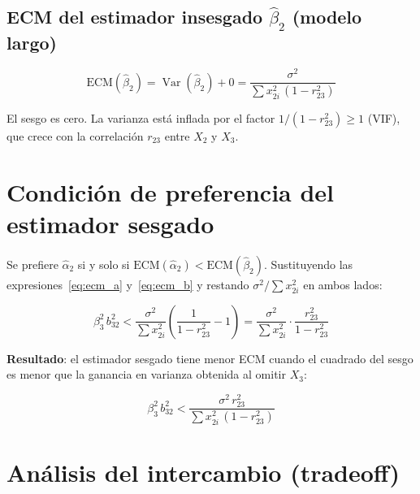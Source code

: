 \documentclass[12pt, letterpaper]{article}
\newcommand{\Var}{\operatorname{Var}}
\begin{document}
\subsection{ECM del estimador insesgado $\hat{\beta}_2$ (modelo largo)}

\begin{equation}
  \mathrm{ECM}(\hat{\beta}_2)
  = \Var(\hat{\beta}_2) + 0
  = \frac{\sigma^2}{\sum x_{2i}^2\,(1 - r_{23}^2)}
\end{equation}

El sesgo es cero. La varianza está inflada por el factor $1/(1-r_{23}^2)\geq 1$
(VIF), que crece con la correlación $r_{23}$ entre $X_2$ y $X_3$.

\section{Condición de preferencia del estimador sesgado}

Se prefiere $\hat{\alpha}_2$ si y solo si
$\mathrm{ECM}(\hat{\alpha}_2) < \mathrm{ECM}(\hat{\beta}_2)$. Sustituyendo
las expresiones~\eqref{eq:ecm_a} y~\eqref{eq:ecm_b} y restando
$\sigma^2/\sum x_{2i}^2$ en ambos lados:

\begin{equation}
  \beta_3^2\,b_{32}^2
  < \frac{\sigma^2}{\sum x_{2i}^2}
    \left(\frac{1}{1 - r_{23}^2} - 1\right)
  = \frac{\sigma^2}{\sum x_{2i}^2} \cdot \frac{r_{23}^2}{1 - r_{23}^2}
\end{equation}

\begin{clave}
  \textbf{Resultado}: el estimador sesgado tiene menor ECM cuando el cuadrado
  del sesgo es menor que la ganancia en varianza obtenida al omitir $X_3$:

  \begin{equation}
    \boxed{\beta_3^2\,b_{32}^2
      < \frac{\sigma^2\,r_{23}^2}{\sum x_{2i}^2\,(1 - r_{23}^2)}}
  \end{equation}
\end{clave}

\section{Análisis del intercambio (tradeoff)}
\end{document}
